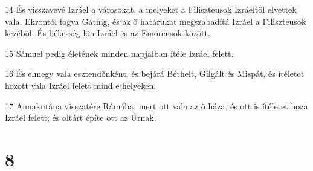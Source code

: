 \par 14 És visszavevé Izráel a városokat, a melyeket a Filiszteusok Izráeltõl elvettek vala, Ekrontól fogva Gáthig, és az õ határukat megszabadítá Izráel a Filiszteusok kezébõl. És békesség lõn Izráel és az Emoreusok között.
\par 15 Sámuel pedig életének minden napjaiban ítéle Izráel felett.
\par 16 És elmegy vala esztendõnként, és bejárá Béthelt, Gilgált és Mispát, és ítéletet hozott vala Izráel felett mind e helyeken.
\par 17 Annakutána visszatére Rámába, mert ott vala az õ háza, és ott is ítéletet hoza Izráel felett; és oltárt építe ott az Úrnak.

\chapter{8}

